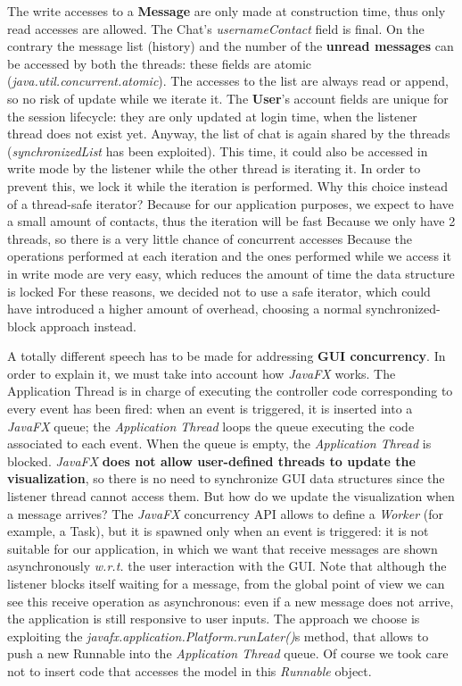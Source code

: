 \begin{outline}
	\1 The write accesses to a \textbf{Message} are only made at construction time, thus only read accesses are allowed.
	\1 The Chat’s \textit{usernameContact} field is final. On the contrary the message list (history) and the number of the \textbf{unread messages} can be accessed by both the threads: these fields are atomic (\textit{java.util.concurrent.atomic}). The accesses to the list are always read or append, so no risk of update while we iterate it.
	\1 The \textbf{User}’s account fields are unique for the session lifecycle: they are only updated at login time, when the listener thread does not exist yet. Anyway, the list of chat is again shared by the threads (\textit{synchronizedList} has been exploited).
This time, it could also be accessed in write mode by the listener while the other thread is iterating it. In order to prevent this, we lock it while the iteration is performed. Why this choice instead of a thread-safe iterator?
	\2 Because for our application purposes, we expect to have a small amount of contacts, thus the iteration will be fast
	\2 Because we only have 2 threads, so there is a very little chance of concurrent accesses
	\2 Because the operations performed at each iteration and the ones performed while we access it in write mode are very easy, which reduces the amount of time the data structure is locked
	\1 For these reasons, we decided not to use a safe iterator, which could have introduced a higher amount of overhead, choosing a normal synchronized-block approach instead.
\end{outline}
A totally different speech has to be made for addressing \textbf{GUI concurrency}. In order to explain it, we must take into account how \textit{JavaFX} works.
The Application Thread is in charge of executing the controller code corresponding to every event has been fired: when an event is triggered, it is inserted into a  \textit{JavaFX} queue; the \textit{Application Thread} loops the queue executing the code associated to each event. When the queue is empty, the  \textit{Application Thread} is blocked.
\textit{JavaFX} \textbf{does not allow user-defined threads to update the visualization}, so there is no need to synchronize GUI data structures since the listener thread cannot access them.
But how do we update the visualization when a message arrives?
The \textit{JavaFX} concurrency API allows to define a \textit{Worker} (for example, a Task), but it is spawned only when an event is triggered: it is not suitable for our application, in which we want that receive messages are shown asynchronously \textit{w.r.t.} the user interaction with the GUI. Note that although the listener blocks itself waiting for a message, from the global point of view we can see this receive operation as asynchronous: even if a new message does not arrive, the application is still responsive to user inputs.
The approach we choose is exploiting the \textit{javafx.application.Platform.runLater()}s method, that allows to push a new Runnable into the \textit{Application Thread} queue. 
Of course we took care not to insert code that accesses the model in this \textit{Runnable} object.

